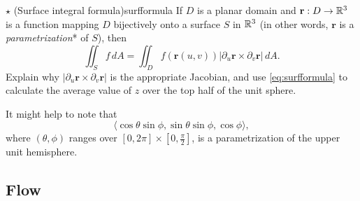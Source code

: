 \documentclass[svgnames]{watsonbook}
\begin{document}
\begin{exercise}{$\star$ (Surface integral formula)}{surfformula}
  If $D$ is a planar domain and $\mathbf{r}:D \to \mathbb{R}^3$ is a function
  mapping $D$ bijectively onto a surface $S$ in $\mathbb{R}^3$ (in other words,
  $\mathbf{r}$ is a \textit{parametrization}* of $S$), then
  \begin{equation} \label{eq:surfformula} 
    \iint_S f \, dA = \iint_D f(\mathbf{r}(u,v)) |\partial_u
    \mathbf{r} \times \partial_v \mathbf{r}| \, dA. 
  \end{equation}
  Explain why $|\partial_u
    \mathbf{r} \times \partial_v \mathbf{r}|$ is the appropriate
    Jacobian, and use \eqref{eq:surfformula} to calculate the average value of
    $z$ over the top half of the unit sphere.

    It might help to note that
    \[
      \langle \cos \theta \sin \phi, \sin \theta \sin \phi, \cos
      \phi
      \rangle, 
    \]
    where $(\theta,\phi)$ ranges over $[0,2\pi] \times
    [0,\tfrac{\pi}{2}]$, is a parametrization of the upper unit
    hemisphere. 
\end{exercise}

\subsection{Flow}

\end{document}

